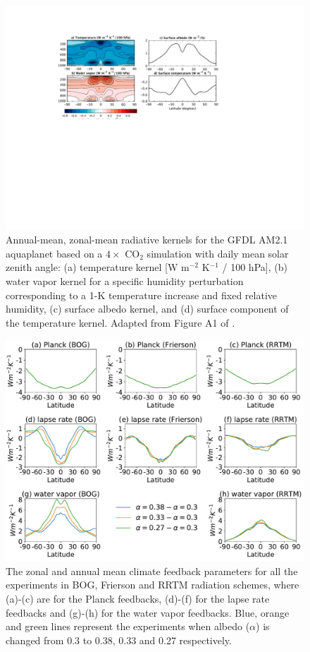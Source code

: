 \begin{figure}[ht] %
	\centering
	\includegraphics[width=.8\linewidth]{figs/polar_amp/Feldl2017}
	\caption{Annual-mean, zonal-mean radiative kernels for
		the GFDL AM2.1 aquaplanet based on a $4\times$ CO$_2$ simulation with daily mean solar zenith angle: (a) temperature kernel [W m$^{-2}$ K$^{-1}$ / 100 hPa], (b) water vapor kernel for a specific humidity perturbation corresponding to a 1-K temperature increase and fixed relative humidity, (c) surface albedo kernel, and (d) surface component of the temperature kernel. Adapted from Figure A1 of \cite{Feldl2017}.}
	\label{fig:feldl_gfdl_am2.1_kernel}
\end{figure}

\begin{figure}[ht]
	\centering
	\includegraphics[width=1\textwidth]{figs/polar_amp/all_zonalmean_feedbacks}
	\caption{The zonal and annual mean climate feedback parameters for all the experiments in BOG, Frierson and RRTM radiation schemes, where (a)-(c) are for the Planck feedbacks, (d)-(f) for the lapse rate feedbacks and (g)-(h) for the water vapor feedbacks. Blue, orange and green lines represent the experiments when albedo ($\alpha$) is changed from 0.3 to 0.38, 0.33 and 0.27 respectively.}
	\label{fig:all_feedbacks}
\end{figure}


